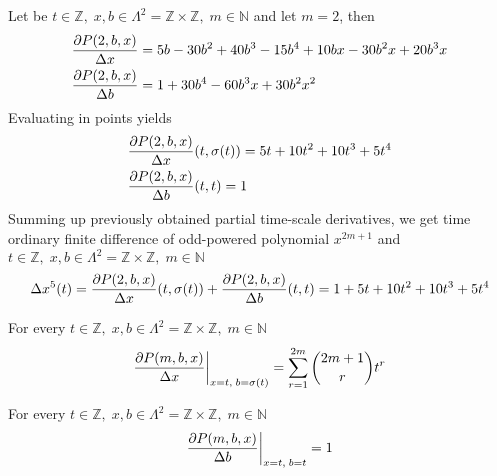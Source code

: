 \begin{examp}
    \label{time_scale_z_example_2}
    Let be $t\in\mathbb{Z}, \;x,b\in\Lambda^2 = \mathbb{Z} \times \mathbb{Z}, \; m\in\mathbb{N}$
    and let $m=2$, then
    \begin{align*}
        &\frac{\partial P ( 2, b, x )}{\Delta x}                = 5 b - 30 b^2 + 40 b^3 - 15 b^4 + 10 b x - 30 b^2 x + 20 b^3 x \\
        &\frac{\partial P ( 2, b, x )}{\Delta b}                = 1 + 30 b^4 - 60 b^3 x + 30 b^2 x^2
    \end{align*}
    Evaluating in points yields
    \begin{align*}
        &\frac{\partial P ( 2, b, x )}{\Delta x} (t, \sigma(t)) = 5 t + 10 t^2 + 10 t^3 + 5 t^4 \\
        &\frac{\partial P ( 2, b, x )}{\Delta b} (t, t)         = 1
    \end{align*}
    Summing up previously obtained partial time-scale derivatives, we get time ordinary finite difference of odd-powered
    polynomial $x^{2m+1}$ and $t\in\mathbb{Z}, \;x,b\in\Lambda^2 = \mathbb{Z} \times \mathbb{Z}, \; m\in\mathbb{N}$
    \begin{align*}
        \Delta x^{5} (t)
        = \frac{\partial P ( 2, b, x )}{\Delta x} (t, \sigma(t))
        + \frac{\partial P ( 2, b, x )}{\Delta b} (t, t)
        = 1 + 5 t + 10 t^2 + 10 t^3 + 5 t^4
    \end{align*}
\end{examp}
\begin{cor}
    \label{time_scale_z_corollary_1}
    For every $t\in\mathbb{Z}, \; x,b\in\Lambda^2 = \mathbb{Z} \times \mathbb{Z}, \; m\in\mathbb{N}$
    \[
        \frac{\partial P ( m, b, x )}{\Delta x} \bigg |_{x = t, \; b = \sigma(t)}
        = \sum_{r=1}^{2m} \binom{2m+1}{r} t^{r}
    \]
\end{cor}
\begin{cor}
    \label{time_scale_z_corollary_2}
    For every $t\in\mathbb{Z}, \; x,b\in\Lambda^2 = \mathbb{Z} \times \mathbb{Z}, \; m\in\mathbb{N}$
    \[
        \frac{\partial P ( m, b, x )}{\Delta b} \bigg |_{x = t, \; b = t} = 1
    \]
\end{cor}
